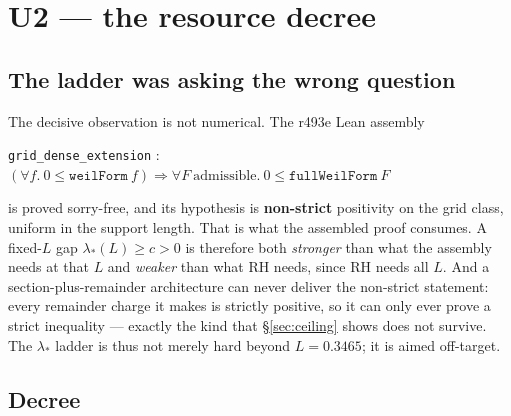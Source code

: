 \documentclass[11pt]{article}
\theoremstyle{remark}
\begin{document}
\section{U2 --- the resource decree}

\subsection{The ladder was asking the wrong question}

The decisive observation is not numerical.  The r493e Lean assembly
\begin{center}
\texttt{grid\_dense\_extension} :
$(\forall f.\ 0\le\texttt{weilForm}\ f)\Rightarrow
 \forall F\ \text{admissible}.\ 0\le\texttt{fullWeilForm}\ F$
\end{center}
is proved sorry-free, and its hypothesis is \textbf{non-strict}
positivity on the grid class, uniform in the support length.  That is
what the assembled proof consumes.  A fixed-$L$ gap $\lambda_*(L)\ge
c>0$ is therefore both \emph{stronger} than what the assembly needs
at that $L$ and \emph{weaker} than what RH needs, since RH needs all
$L$.  And a section-plus-remainder architecture can never deliver the
non-strict statement: every remainder charge it makes is strictly
positive, so it can only ever prove a strict inequality --- exactly
the kind that \S\ref{sec:ceiling} shows does not survive.
The $\lambda_*$ ladder is thus not merely hard beyond $L=0.3465$; it
is aimed off-target.

\subsection{Decree}
\end{document}
